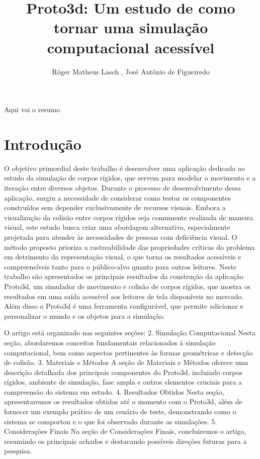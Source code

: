 \documentclass[12pt]{article}
\title{Proto3d: Um estudo de como tornar uma simulação computacional acessível}
\author{Róger Matheus Lasch \inst{1}, José Antônio de Figueiredo\inst{1}}
\begin{document}
 

\maketitle

\begin{abstract}
\end{abstract}
     
\begin{resumo} 
  Aqui vai o resumo
\end{resumo}

\section{Introdução}
O objetivo primordial deste trabalho é desenvolver uma aplicação dedicada ao estudo da simulação de corpos rígidos, que servem para modelar o movimento e a iteração entre diversos objetos. Durante o processo de desenvolvimento dessa aplicação, surgiu a necessidade de considerar como testar os componentes construídos sem depender exclusivamente de recursos visuais.
 Embora a visualização da colisão entre corpos rígidos seja  comumente realizada de maneira visual, este estudo busca criar uma abordagem alternativa, especialmente projetada para atender às necessidades de pessoas com deficiência visual. O método proposto prioriza a rastreabilidade das propriedades críticas do problema em detrimento da representação visual, o que torna os resultados acessíveis e compreensíveis tanto para o público-alvo quanto para outros leitores.
Neste trabalho são apresentados os principais resultados da construção da aplicação Proto3d, um simulador de movimento e colisão de corpos rígidos, que mostra os resultados em uma saída acessível aos leitores de tela disponíveis no mercado. Além disso o Proto3d é uma ferramenta configurável, que permite adicionar e personalizar o mundo e os objetos para a simulação.

O artigo está organizado nas seguintes seções:
2. Simulação Computacional
Nesta seção, abordaremos conceitos fundamentais relacionados à simulação computacional, bem como aspectos pertinentes às formas geométricas e detecção de colisão.
3. Materiais e Métodos
A seção de Materiais e Métodos oferece uma descrição detalhada dos principais componentes do Proto3d, incluindo corpos rígidos, ambiente de simulação, fase ampla e outros elementos cruciais para a compreensão do sistema em estudo.
4. Resultados Obtidos
Nesta seção, apresentaremos os resultados obtidos até o momento com o Proto3d, além de fornecer um exemplo prático de um cenário de teste, demonstrando como o sistema se comportou e o que foi observado durante as simulações.
5. Considerações Finais
Na seção de Considerações Finais, concluiremos o artigo, resumindo os principais achados e destacando possíveis direções futuras para a pesquisa.
\end{document}
